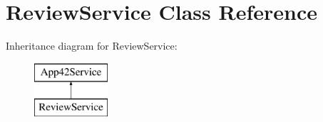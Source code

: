 \hypertarget{class_review_service}{\section{Review\+Service Class Reference}
\label{class_review_service}
}
Inheritance diagram for Review\+Service\+:\begin{figure}[H]
\begin{center}
\leavevmode
\includegraphics[height=2.000000cm]{class_review_service}
\end{center}
\end{figure}
